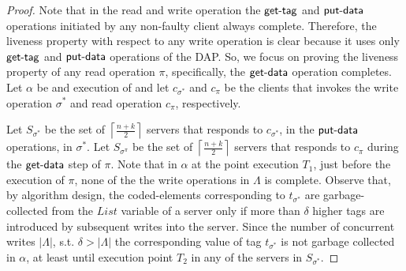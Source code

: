 \begin{proof}
Note that in the read and write operation the  $\act{get-tag}$ and $\act{put-data}$ operations initiated by any non-faulty client  always complete. Therefore, the liveness property with respect to any write operation is clear because it uses only  $\act{get-tag}$ and $\act{put-data}$ operations of the DAP. So, we focus on proving the liveness property of any read operation $\pi$, 
specifically,   the  $\act{get-data}$ operation completes. Let $\alpha $ be and execution of \treas{} and let 
$c_{\sigma^*}$ and $c_{\pi}$ be the clients that invokes the write operation $\sigma^*$ and read operation $c_{\pi}$, respectively.
				
Let $S_{\sigma^{*}}$ be the set of 
$\left\lceil \frac{n+k}{2} \right \rceil$ servers that responds to $c_{\sigma^*}$, in the $\act{put-data}$ operations, in $\sigma^*$.
Let $S_{\sigma^{\pi}}$ be the set of $\left\lceil \frac{n+k}{2} \right \rceil$ servers that responds to  $c_{\pi}$ during the  $\act{get-data}$ step of $\pi$. Note that in $\alpha$ at the point execution $T_1$, just before the execution of  $\pi$, none of the the write operations in 
$\Lambda$ is complete. Observe that,  by algorithm design, the coded-elements corresponding to  $t_{\sigma^*}$ are garbage-collected from the $List$ variable of a server only if more than $\delta$ higher tags are introduced by subsequent writes into the server.  Since the number of concurrent writes  $|\Lambda|$, s.t.  $\delta > | \Lambda |$ the corresponding value of tag $t_{\sigma^*}$ is not garbage collected in $\alpha$, at least until execution point $T_2$  in  any of the servers in $S_{\sigma^*}$.


\end{proof}
